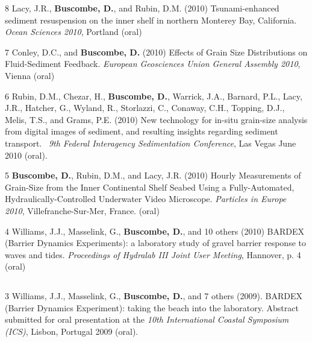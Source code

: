 \documentclass[margin,line]{resume}
\begin{document}
\begin{resume}
\begin{footnotesize}
\begin{list1}
	\item[8] Lacy, J.R., {\bf Buscombe, D.}, and Rubin, D.M. (2010) Tsunami-enhanced sediment resuspension on the inner shelf in northern Monterey Bay, California. {\sl Ocean Sciences 2010}, Portland (oral)\\

	\item[7] Conley, D.C., and {\bf Buscombe, D.} (2010) Effects of Grain Size Distributions on Fluid-Sediment Feedback. {\sl European Geosciences Union General Assembly 2010}, Vienna (oral)\\

	\item[6] Rubin, D.M., Chezar, H., {\bf Buscombe, D.}, Warrick, J.A., Barnard, P.L., Lacy, J.R., Hatcher, G., Wyland, R., Storlazzi, C., Conaway, C.H., Topping, D.J., Melis, T.S., and Grams, P.E. (2010) New technology for in-situ grain-size analysis from digital images of sediment, and resulting insights regarding sediment transport.  {\sl 9th Federal Interagency Sedimentation Conference}, Las Vegas June 2010 (oral).\\

	\item[5] {\bf Buscombe, D.}, Rubin, D.M., and Lacy, J.R. (2010) Hourly Measurements of Grain-Size from the Inner Continental Shelf Seabed Using a Fully-Automated, Hydraulically-Controlled Underwater Video Microscope. {\sl Particles in Europe 2010}, Villefranche-Sur-Mer, France. (oral)\\

	\item[4] Williams, J.J., Masselink, G., {\bf Buscombe, D.}, and 10 others (2010) BARDEX (Barrier Dynamics Experiments): a laboratory study of gravel barrier response to waves and tides. {\sl Proceedings of Hydralab III Joint User Meeting}, Hannover, p. 4 (oral)
	\end{list1}
	
	\subsection{}
	\begin{list1}
	\item[3] Williams, J.J., Masselink, G., {\bf Buscombe, D.}, and 7 others (2009). BARDEX (Barrier Dynamics Experiment): taking the beach into the laboratory. Abstract submitted for oral presentation at the {\sl 10th International Coastal Symposium (ICS)}, Lisbon, Portugal 2009 (oral).
	\end{list1}


\end{footnotesize}
\end{resume}
\end{document}
